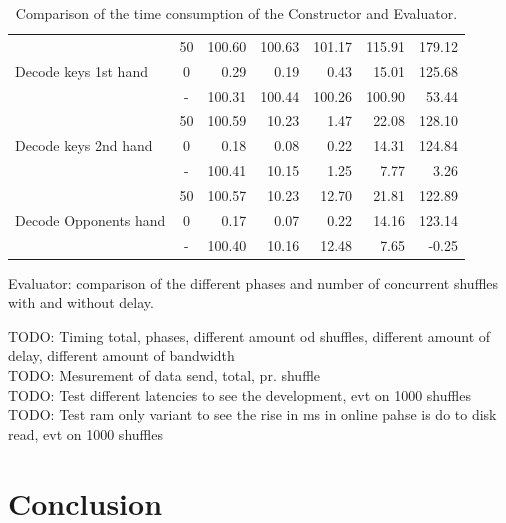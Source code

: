 \documentclass[twoside,11pt,openright]{report}
\newcommand{\todo}[1]{}
\renewcommand{\todo}[1]{{\color{red} TODO: {#1}} \\}
\begin{document}
\begin{table}[!htb]
\begin{subtable}{\textwidth}
{\begin{tabular}{l || c |r r r r r}
    \multirow{3}{*}{Decode keys 1st hand} & 50 & 100.60 & 100.63 & 101.17 & 115.91 & 179.12 \\
                                          &  0 &   0.29 &   0.19 &   0.43 &  15.01 & 125.68 \\
                                          \cline{2-7}
                                          &  - & 100.31 & 100.44 & 100.26 & 100.90 &  53.44 \\
    \hline
    \multirow{3}{*}{Decode keys 2nd hand} & 50 & 100.59 & 10.23 & 1.47 & 22.08 & 128.10 \\
                                          &  0 &   0.18 &  0.08 & 0.22 & 14.31 & 124.84 \\ 
                                          \cline{2-7}
                                          &  - & 100.41 & 10.15 & 1.25 &  7.77 &   3.26 \\
    \hline
    \multirow{3}{*}{Decode Opponents hand} & 50 & 100.57 & 10.23 & 12.70 & 21.81 & 122.89 \\
                                           &  0 &   0.17 &  0.07 &  0.22 & 14.16 & 123.14 \\
                                           \cline{2-7}
                                           &  - & 100.40 & 10.16 & 12.48 &  7.65 & -0.25
    \end{tabular}
    }
    \caption{Evaluator: comparison of the different phases and number of concurrent shuffles with and without delay.}
    \end{subtable}%

\caption{Comparison of the time consumption of the Constructor and Evaluator.}
\end{table}

\todo{Timing total, phases, different amount od shuffles, different amount of delay, different amount of bandwidth}

\todo{Mesurement of data send, total, pr. shuffle}

\todo{Test different latencies to see the development, evt on 1000 shuffles}

\todo{Test ram only variant to see the rise in ms in online pahse is do to disk read, evt on 1000 shuffles}



\chapter{Conclusion}
\label{ch:conclusion}

\end{document}
